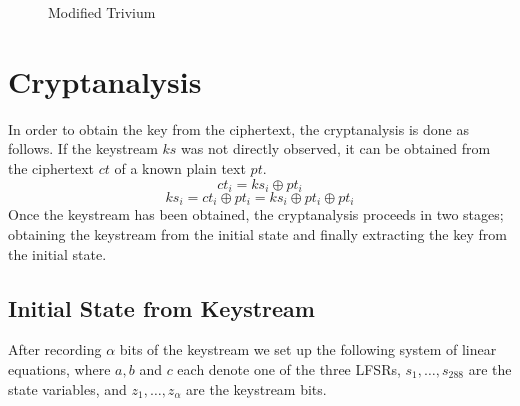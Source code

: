 \documentclass[conference]{IEEEtran}
\begin{document}
\begin{figure}[H]
\centering

\caption{Modified Trivium}
\label{fig:modified}
\end{figure}

\section{Cryptanalysis}\label{sec:cryptanalysis}

In order to obtain the key from the ciphertext, the cryptanalysis is done as follows. If the keystream $ks$ was not directly observed, it can be obtained from the ciphertext $ct$ of a known plain text $pt$. 
$$ct_i = ks_i \oplus pt_i$$
$$ks_i = ct_i \oplus pt_i = ks_i \oplus pt_i \oplus pt_i$$
Once the keystream has been obtained, the cryptanalysis proceeds in two stages; obtaining the keystream from the initial state and finally extracting the key from the initial state.

\subsection{Initial State from Keystream}

After recording $\alpha$ bits of the keystream we set up the following system of linear equations, where $a,b$ and $c$ each denote one of the three LFSRs, $s_1,\dots,s_{288}$ are the state variables, and $z_1,\dots,z_{\alpha}$ are the keystream bits. 
\end{document}
